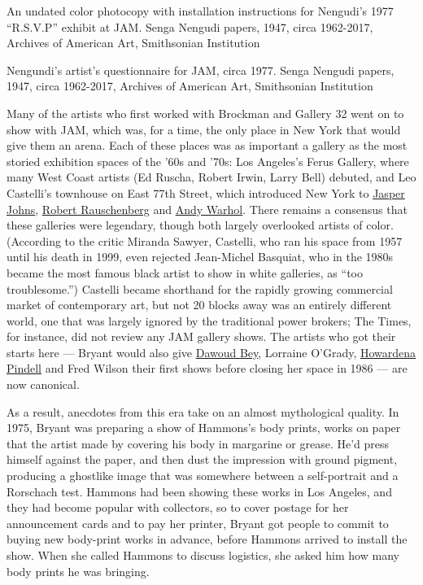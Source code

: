 An undated color photocopy with installation instructions for Nengudi's
1977 ``R.S.V.P'' exhibit at JAM. Senga Nengudi papers, 1947, circa
1962-2017, Archives of American Art, Smithsonian Institution

Nengundi's artist's questionnaire for JAM, circa 1977. Senga Nengudi
papers, 1947, circa 1962-2017, Archives of American Art, Smithsonian
Institution

Many of the artists who first worked with Brockman and Gallery 32 went
on to show with JAM, which was, for a time, the only place in New York
that would give them an arena. Each of these places was as important a
gallery as the most storied exhibition spaces of the '60s and '70s: Los
Angeles's Ferus Gallery, where many West Coast artists (Ed Ruscha,
Robert Irwin, Larry Bell) debuted, and Leo Castelli's townhouse on East
77th Street, which introduced New York to
\href{https://www.nytimes.com/2019/02/18/t-magazine/jasper-johns.html}{Jasper
Johns},
\href{https://www.nytimes.com/topic/person/robert-rauschenberg}{Robert
Rauschenberg} and
\href{https://www.nytimes.com/topic/person/andy-warhol}{Andy Warhol}.
There remains a consensus that these galleries were legendary, though
both largely overlooked artists of color. (According to the critic
Miranda Sawyer, Castelli, who ran his space from 1957 until his death in
1999, even rejected Jean-Michel Basquiat, who in the 1980s became the
most famous black artist to show in white galleries, as ``too
troublesome.'') Castelli became shorthand for the rapidly growing
commercial market of contemporary art, but not 20 blocks away was an
entirely different world, one that was largely ignored by the
traditional power brokers; The Times, for instance, did not review any
JAM gallery shows. The artists who got their starts here --- Bryant
would also give
\href{https://www.nytimes.com/2019/05/01/arts/design/dawoud-bey-david-hammons-jam-frieze.html}{Dawoud
Bey}, Lorraine O'Grady,
\href{https://www.nytimes.com/2019/03/23/arts/design/black-artists-older-success.html}{Howardena
Pindell} and Fred Wilson their first shows before closing her space in
1986 --- are now canonical.

As a result, anecdotes from this era take on an almost mythological
quality. In 1975, Bryant was preparing a show of Hammons's body prints,
works on paper that the artist made by covering his body in margarine or
grease. He'd press himself against the paper, and then dust the
impression with ground pigment, producing a ghostlike image that was
somewhere between a self-portrait and a Rorschach test. Hammons had been
showing these works in Los Angeles, and they had become popular with
collectors, so to cover postage for her announcement cards and to pay
her printer, Bryant got people to commit to buying new body-print works
in advance, before Hammons arrived to install the show. When she called
Hammons to discuss logistics, she asked him how many body prints he was
bringing.

